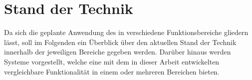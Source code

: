 \chapter{Stand der Technik}
\label{chap.tech}
\prever{
}

Da sich die geplante Anwendung des  in verschiedene Funktionsbereiche gliedern lässt, soll im Folgenden ein Überblick über den aktuellen Stand der Technik innerhalb der jeweiligen Bereiche gegeben werden. Darüber hinaus werden Systeme vorgestellt, welche eine mit dem in dieser Arbeit entwickelten \kps{} vergleichbare Funktionalität in einem oder mehreren Bereichen bieten.

